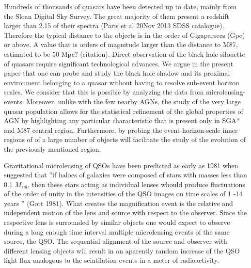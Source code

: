 Hundreds of thousands of quasars have been detected up to date, mainly from the Sloan Digital Sky Survey. The great majority of them present a redshift larger than 2.15 of their spectra (Paris et al 20Nov 2013 SDSS catalogue). Therefore the typical distance to the objects is in the order of Gigaparsecs (Gpc) or above. A value that is orders of magnitude 
larger than the distance to M87, estimated to be 50 Mpc? (citation). Direct observation of the black hole silouette of quasars require significant technological advances. We argue in the present paper
 that one can probe and study the black hole shadow and its proximal environment belonging to a quasar without having to resolve sub-event horizon scales. We consider that this is possible by analyzing the data from microlensing-events.  Moreover, unlike with the few nearby AGNs, the study of the very large quasar population allows for the statistical refinement of the global properties of AGN by highlighting any particular
characteristic that is present only in SGA* and M87 central region. Furthermore, by probing the event-horizon-scale inner regions of of a large number of objects will facilitate the study of the evolution of the previously mentioned region.     
     
Gravitational microlensing of QSOs have been predicted as early as 1981 when \cite{1981ApJ...243..140G} suggested that ''if haloes of galaxies were composed of stars with masses less than  0.1 $M_{sol}$, then these stars acting as individual lenses whould produce fluctuations of the order of 
unity in the intensities of the QSO images on time scales of 1 -14 years '' (Gott 1981). What creates the magnification event is the relative and independent motion of the lens and source with respect to the observer. Since the respective lens is surrounded by similar objects one would expect to observe during a long enough time interval
multiple microlensing events of the same source, the QSO. The sequential alignment of the source and observer with different lensing objects will result in an aparently random increase of the QSO light flux analogous to the scintilation events in a meter of radioactivity.

